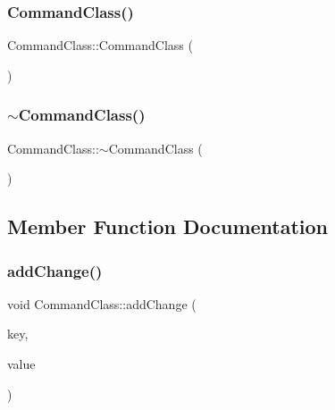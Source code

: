 \mbox{\label{class_command_class_a9aff7dc67892ec24992a74c86d7a1355}} 
\subsubsection{\texorpdfstring{Command\+Class()}{CommandClass()}\hspace{0.1cm}{\footnotesize\ttfamily [2/2]}}
{\footnotesize\ttfamily Command\+Class\+::\+Command\+Class (\begin{DoxyParamCaption}\item[{const \hyperlink{class_command_class}{Command\+Class} \&}]{ }\end{DoxyParamCaption})}

\mbox{\label{class_command_class_aff8cc15df547b14f550df769b4d81931}} 
\subsubsection{\texorpdfstring{$\sim$\+Command\+Class()}{~CommandClass()}}
{\footnotesize\ttfamily Command\+Class\+::$\sim$\+Command\+Class (\begin{DoxyParamCaption}{ }\end{DoxyParamCaption})}



\subsection{Member Function Documentation}
\mbox{\label{class_command_class_a30ed51838ac94117d32d4906f492af85}} 
\subsubsection{\texorpdfstring{add\+Change()}{addChange()}\hspace{0.1cm}{\footnotesize\ttfamily [1/3]}}
{\footnotesize\ttfamily void Command\+Class\+::add\+Change (\begin{DoxyParamCaption}\item[{const std\+::string \&}]{key,  }\item[{const std\+::string \&}]{value }\end{DoxyParamCaption})}



